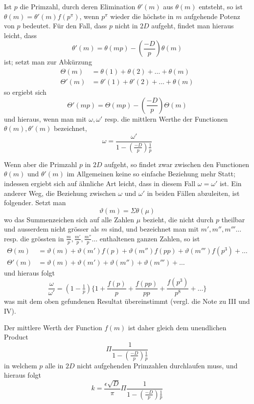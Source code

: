 Ist $p$ die Primzahl, durch deren Elimination $\theta'(m)$ aus $\theta(m)$ entsteht, so ist $\theta(m)=\theta'(m)f(p^\pi)$, wenn $p^\pi$ wieder die höchste in $m$ aufgehende Potenz von $p$ bedeutet. Für den Fall, dass $p$ nicht in $2D$ aufgeht, findet man hieraus leicht, dass
\[
\theta'(m)=\theta(mp)-\left(\frac{-D}p\right)\theta(m)
\]
ist; setzt man zur Abkürzung
\[
\begin{aligned}
\Theta(m)&=\theta(1)+\theta(2)+\ldots+\theta(m)\\
\Theta'(m)&=\theta'(1)+\theta'(2)+\ldots+\theta(m)
\end{aligned}
\]
so ergiebt sich
\[
\Theta'(mp)=\Theta(mp)-\left(\frac{-D}p\right)\Theta(m)
\]
und hieraus, wenn man mit $\omega,\omega'$ resp. die mittlern Werthe der Functionen $\theta(m),\theta'(m)$ bezeichnet,
\[
\omega=\frac{\omega'}{1-\left(\frac{-D}p\right)\frac1p}
\]

Wenn aber die Primzahl $p$ in $2D$ aufgeht, so findet zwar zwischen den Functionen $\theta(m)$ und $\theta'(m)$ im Allgemeinen keine so einfache Beziehung mehr Statt; indessen ergiebt sich auf ähnliche Art leicht, dass in diesem Fall $\omega=\omega'$ ist. Ein anderer Weg, die Beziehung zwischen $\omega$ und $\omega'$ in beiden Fällen abzuleiten, ist folgender. Setzt man
\[
\vartheta(m)=\Sigma\theta(\mu)
\]
wo das Summenzeichen sich auf alle Zahlen $\mu$ bezieht, die nicht durch $p$ theilbar und ausserdem nicht grösser als $m$ sind, und bezeichnet man mit $m',m'',m'''\ldots$ resp. die grössten in $\frac mp,\frac{m'}p,\frac{m''}p\ldots$ enthaltenen ganzen Zahlen, so ist
\[
\begin{aligned}
\Theta(m)&=\vartheta(m)+\vartheta(m')f(p)+\vartheta(m'')f(pp)+\vartheta(m''')f(p^3)+\ldots\\
\Theta'(m)&=\vartheta(m)+\vartheta(m')+\vartheta(m'')+\vartheta(m''')+\ldots
\end{aligned}
\]
und hieraus folgt
\[
\frac\omega{\omega'}=(1-\tfrac1p)\{1+\frac{f(p)}p+\frac{f(pp)}{pp}+\frac{f(p^3)}{p^8}+\ldots\}
\]
was mit dem oben gefundenen Resultat übereinstimmt (vergl. die Note zu III und IV).

Der mittlere Werth der Function $f(m)$ ist daher gleich dem unendlichen Product
\[
\Pi\frac1{1-\left(\frac{-D}p\right)\frac1p}
\]
in welchem $p$ alle in $2D$ nicht aufgehenden Primzahlen durchlaufen muss, und hieraus folgt
\[
k=\frac{\epsilon\surd D}\pi\Pi\frac1{1-\left(\frac{-D}p\right)\frac1p}
\]

